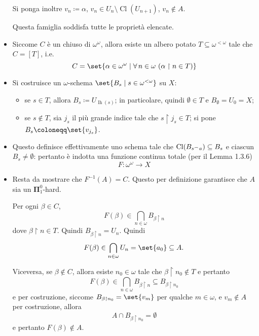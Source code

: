 \documentclass{article}
\newcommand{\1}{\mathds{1}}
\newcommand{\concat}{\null^{\frown}} %
\begin{document}
\begin{itemize}
Si ponga inoltre \(v_{n} \coloneqq \alpha\), \(v_{n} \in U_{n}\setminus \operatorname{Cl}(U_{n+1})\), \(v_{n}\notin A\).

Questa famiglia soddisfa tutte le proprietà elencate.

\item Siccome \(C\) è un chiuso di \(\omega^{\omega}\), allora esiste un albero potato \(T \subseteq \omega^{<\omega}\) tale che \(C=[T]\), i.e.
\begin{equation*}
  	C= \set{\alpha \in \omega^{\omega}\mid \forall\,n \in \omega\ (\alpha\upharpoonright n \in T)}
\end{equation*}
\item Si costruisce un \(\omega\)-schema \(\set{B_{s}\mid s \in \omega^{<\omega}}\) su \(X\):
\begin{itemize}
\item se \(s \in T\), allora \(B_{s} \coloneqq U_{\operatorname{lh}(s)}\); in particolare, quindi \(\emptyset \in T\) e \(B_{\emptyset} = U_{0} = X\);
\item se \(s\notin T\), sia \(j_{s}\) il più grande indice tale che \(s\upharpoonright j_{s} \in T\); si pone \(B_{s} \coloneqq \set{v_{j_{s}}}\).
\end{itemize}
\item Questo definisce effettivamente uno schema tale che \(\operatorname{Cl}(B_{s\concat a}) \subseteq B_{s}\) e ciascun \(B_{s}\neq \emptyset\): pertanto è indotta una funzione continua totale (per il Lemma 1.3.6)
\begin{equation*}
  	F:\omega^{\omega}\to X
\end{equation*}
\item Resta da mostrare che \(F^{-1}(A) = C\). Questo per definizione garantisce che \(A\) sia un \(\bm{\Pi}_{1}^{0}\)-hard.

Per ogni \(\beta \in C\),
\begin{equation*}
  	F(\beta) \in \bigcap_{n \in \omega} B_{\beta\upharpoonright n}
\end{equation*}
dove \(\beta\upharpoonright n \in T\). Quindi \(B_{\beta\upharpoonright n} = U_{n}\). Quindi
\begin{equation*}
  	F(\beta) \in \bigcap_{n \in \omega} U_{n} = \set{a_{0}} \subseteq A.
\end{equation*}

Viceversa, se \(\beta \notin C\), allora esiste \(n_{0} \in \omega\) tale che \(\beta\upharpoonright n_{0} \notin T\) e pertanto
\begin{equation*}
  	F(\beta) \in \bigcap_{n \in\omega} B_{\beta\upharpoonright n} \subseteq B_{\beta\upharpoonright n_{0}}
\end{equation*}
e per costruzione, siccome \(B_{\beta\upharpoonright n_{0}} = \set{v_{m}}\) per qualche \(m \in \omega\), e \(v_{m}\notin A\) per costruzione, allora
\begin{equation*}
  	A\cap B_{\beta\upharpoonright n_{0}} = \emptyset
\end{equation*}
e pertanto \(F(\beta)\notin A\).
\end{itemize}
\end{document}
